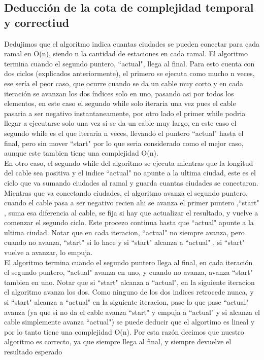 \subsection{Deducción de la cota de complejidad temporal y correctiud}

Dedujimos que el algoritmo indica cuantas ciudades se pueden conectar para cada ramal en O(n), siendo n la cantidad de estaciones en cada ramal. El algoritmo termina cuando el segundo puntero, ``actual"$ $, llega al final. Para esto cuenta con dos ciclos (explicados anteriormente), el primero se ejecuta como mucho n veces, ese sería el peor caso, que ocurre cuando se da un cable muy corto y en cada iteración se avanzan los dos índices solo en uno, pasando asi por todos los elementos, en este caso el segundo while solo iteraria una vez pues el cable pasaria a ser negativo instantaneamente, por otro lado el primer while podria llegar a ejecutarse solo una vez si se da un cable muy largo, en este caso el segundo while es el que iteraria n veces, llevando el puntero ``actual"$ $ hasta el final, pero sin mover ``start"$ $ por lo que seria considerado como el mejor caso, aunque este tambien tiene una complejidad O(n).\\
En otro caso, el segundo while del algoritmo se ejecuta mientras que la longitud del cable sea positiva y el indice ``actual"$ $ no apunte a la ultima ciudad, este es el ciclo que va sumando ciudades al ramal y guarda cuantas ciudades se conectaron. Mientras que va conectando ciudades, el algoritmo avanza el segundo puntero, cuando el cable pasa a ser negativo recien ahi se avanza el primer puntero  ,``start"$ $,  suma esa diferencia al cable, se fija si hay que actualizar el resultado, y vuelve a comenzar el segundo ciclo. Este procezo continua hasta que ``actual"$ $ apunte a la ultima ciudad. Notar que en cada iteracion, ``actual"$ $ no siempre avanza, pero cuando no avanza, ``start"$ $ si lo hace y si ``start"$ $ alcanza a ``actual"$ $ , si ``start"$ $ vuelve a avanzar, lo empuja.\\

El algoritmo termina cuando el segundo puntero llega al final, en cada iteración el segundo puntero, ``actual"$ $ avanza en uno, y cuando no avanza, avanza ``start"$ $  tambien en uno. Notar que si ``start"$ $ alcanza a ``actual"$ $, en la siguiente iteracion el algoritmo avanza los dos. Como ninguno de los dos indices retrocede nunca, y si ``start"$ $ alcanza a ``actual"$ $ en la siguiente iteracion, pase lo que pase ``actual"$ $ avanza (ya que si no da el cable avanza ``start"$ $ y empuja a ``actual"$ $ y si alcanza el cable simplemente avanza ``actual"$ $) se puede deducir que el algortimo es lineal y por lo tanto tiene una complejidad O(n). Por esta razón decimos que nuestro algoritmo es correcto, ya que siempre llega al final, y siempre devuelve el resultado esperado

